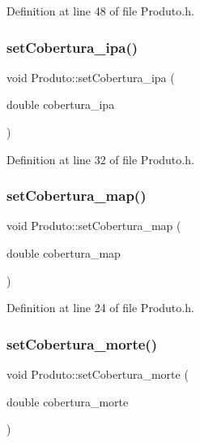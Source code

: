 Definition at line 48 of file Produto.\+h.

\hypertarget{class_produto_aa73736a3bd3b4eb3c44be23d22ba7b28}{}\label{class_produto_aa73736a3bd3b4eb3c44be23d22ba7b28} 
\subsubsection{\texorpdfstring{set\+Cobertura\+\_\+ipa()}{setCobertura\_ipa()}}
{\footnotesize\ttfamily void Produto\+::set\+Cobertura\+\_\+ipa (\begin{DoxyParamCaption}\item[{double}]{cobertura\+\_\+ipa }\end{DoxyParamCaption})\hspace{0.3cm}{\ttfamily [inline]}}



Definition at line 32 of file Produto.\+h.

\hypertarget{class_produto_ae59bdeebd4cdf976b7e4fba925279d89}{}\label{class_produto_ae59bdeebd4cdf976b7e4fba925279d89} 
\subsubsection{\texorpdfstring{set\+Cobertura\+\_\+map()}{setCobertura\_map()}}
{\footnotesize\ttfamily void Produto\+::set\+Cobertura\+\_\+map (\begin{DoxyParamCaption}\item[{double}]{cobertura\+\_\+map }\end{DoxyParamCaption})\hspace{0.3cm}{\ttfamily [inline]}}



Definition at line 24 of file Produto.\+h.

\hypertarget{class_produto_a8422c0f72c56a4ce90af73ebf4f5c203}{}\label{class_produto_a8422c0f72c56a4ce90af73ebf4f5c203} 
\subsubsection{\texorpdfstring{set\+Cobertura\+\_\+morte()}{setCobertura\_morte()}}
{\footnotesize\ttfamily void Produto\+::set\+Cobertura\+\_\+morte (\begin{DoxyParamCaption}\item[{double}]{cobertura\+\_\+morte }\end{DoxyParamCaption})\hspace{0.3cm}{\ttfamily [inline]}}



